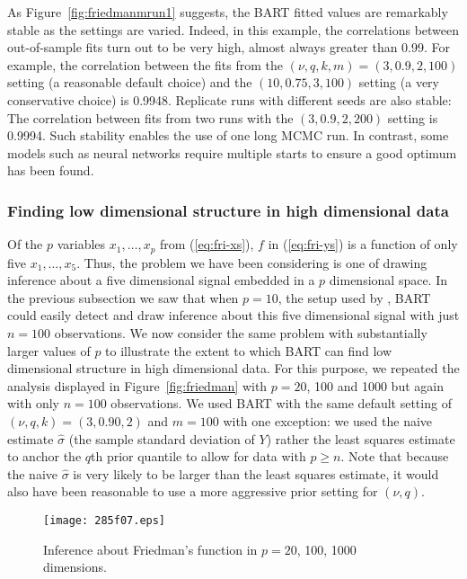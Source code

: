 \documentclass[aoas,nameyear,dvips]{arximspdf}
\newcommand{\citeasnoun}[1]{\citet{#1}}
\begin{document}
As Figure~\ref{fig:friedmanmrun1} suggests, the BART fitted values
are remarkably stable as the settings are varied. Indeed, in this
example, the correlations between out-of-sample fits turn out to
be very high, almost always greater than 0.99. For example, the
correlation between the fits from the $(\nu,q,k,m)=(3,0.9,2,100)$
setting (a reasonable default choice) and the $(10,0.75,3,100)$
setting (a very conservative choice) is 0.9948. Replicate runs with
different seeds are also stable: The correlation between fits from
two runs with the $(3,0.9,2,200)$ setting is 0.9994. Such stability
enables the use of one long MCMC run.  In contrast, some models
such as neural networks require multiple starts to ensure a good
optimum has been found.


\subsubsection{Finding low dimensional structure in high dimensional data}\label{sec:friedman-finding}

Of the $p$ variables $x_1,\ldots,x_p$ from (\ref{eq:fri-xs}), $f$
in (\ref{eq:fri-ys}) is a function of only five $x_1,\ldots,x_5$.
Thus, the problem we have been considering is one of drawing
inference about a five dimensional signal embedded in a $p$
dimensional space. In the previous subsection we saw that when $p
= 10$, the setup used by \citeasnoun{Frie1991}, BART could easily
detect and draw inference about this five dimensional signal with
just $n = 100$ observations. We now consider the same problem with
substantially larger values of $p$ to illustrate the extent to
which BART can find low dimensional structure in high dimensional
data.   For this purpose, we repeated the analysis displayed in
Figure~\ref{fig:friedman} with $p = 20$, 100 and 1000 but again
with only $n = 100$ observations.  We used BART with the same
default setting of $(\nu, q, k) = (3,0.90,2)$ and $m = 100$ with
one exception: we used the naive estimate $\hat{\sigma}$ (the
sample standard deviation of $Y$) rather the least squares
estimate to anchor the $q$th prior quantile to allow for data with
$p \ge n$. Note that because the naive $\hat{\sigma}$ is very
likely to be larger than the least squares estimate, it would also
have been reasonable to use a more aggressive prior setting for
$(\nu,q)$.


\begin{figure}

\texttt{[image: 285f07.eps]}

\caption{Inference about Friedman's function in $p = 20$, 100, 1000 dimensions.}\label{fig:friedmanbigp}
\end{figure}
\end{document}
